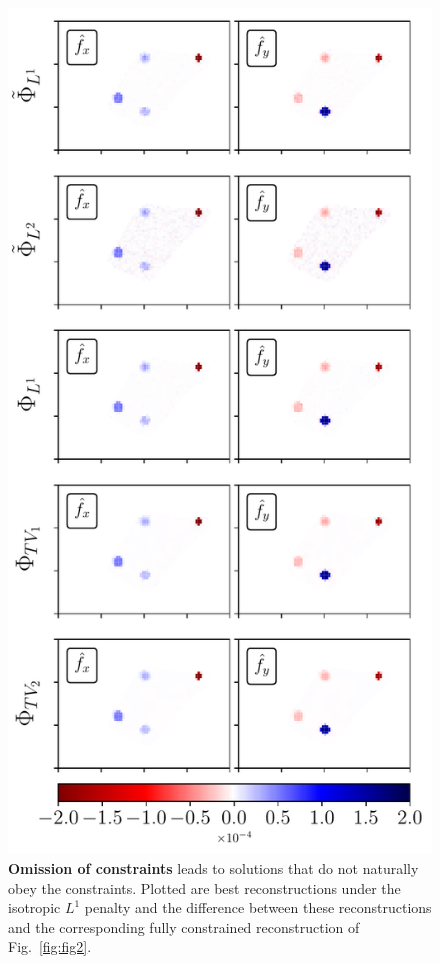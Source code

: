 \documentclass[aps,prl,reprint,twocolumn,groupedaddress,showpacs]{revtex4-1}
\begin{document}
\begin{figure}
\includegraphics[width=\linewidth]{fig3}
\caption{\textbf{Omission of constraints} leads to solutions that do
  not naturally obey the constraints. Plotted are best reconstructions
  under the isotropic $L^1$ penalty and the difference between these
  reconstructions and the corresponding fully constrained
  reconstruction of Fig.~\ref{fig:fig2}. }
\label{fig:fig3}
\end{figure}
\end{document}
